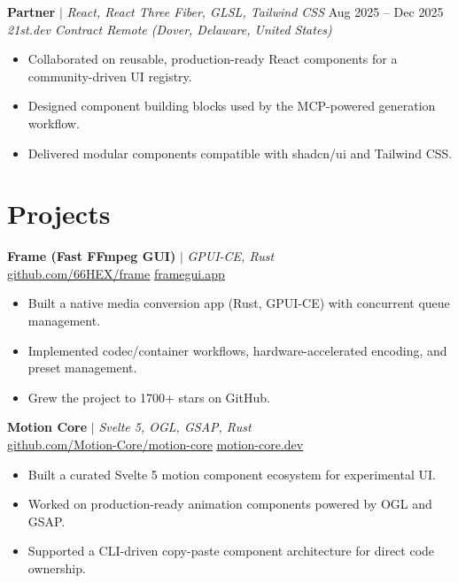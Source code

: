 \documentclass[10pt,a4paper]{article}
\let\oldhref\href
\renewcommand{\href}[2]{\oldhref{#1}{\uline{#2}}}
\begin{document}
\textbf{Partner} $|$ \textit{React, React Three Fiber, GLSL, Tailwind CSS} \hfill Aug 2025 -- Dec 2025\\
\textit{21st.dev \textbar{} Contract \textbar{} Remote (Dover, Delaware, United States)}
\begin{itemize}
  \item Collaborated on reusable, production-ready React components for a community-driven UI registry.
  \item Designed component building blocks used by the MCP-powered generation workflow.
  \item Delivered modular components compatible with shadcn/ui and Tailwind CSS.
\end{itemize}

\section{Projects}

\textbf{Frame (Fast FFmpeg GUI)} $|$ \textit{GPUI-CE, Rust} \hfill\\
\href{https://github.com/66HEX/frame}{github.com/66HEX/frame} \textbar{} \href{https://www.framegui.app/}{framegui.app}
\begin{itemize}
  \item Built a native media conversion app (Rust, GPUI-CE) with concurrent queue management.
  \item Implemented codec/container workflows, hardware-accelerated encoding, and preset management.
  \item Grew the project to 1700+ stars on GitHub.
\end{itemize}

\textbf{Motion Core} $|$ \textit{Svelte 5, OGL, GSAP, Rust} \hfill\\
\href{https://github.com/Motion-Core/motion-core}{github.com/Motion-Core/motion-core} \textbar{} \href{https://motion-core.dev/}{motion-core.dev}
\begin{itemize}
  \item Built a curated Svelte 5 motion component ecosystem for experimental UI.
  \item Worked on production-ready animation components powered by OGL and GSAP.
  \item Supported a CLI-driven copy-paste component architecture for direct code ownership.
\end{itemize}
\end{document}
